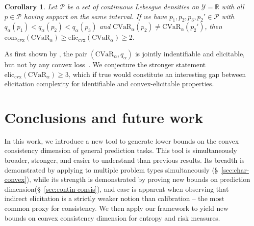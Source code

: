 \documentclass[11pt]{article} %
\newcommand{\Comments}{1}
\newcommand{\mynote}[2]{\ifnum\Comments=1\textcolor{#1}{#2}\fi}
\newcommand{\jessie}[1]{\mynote{purple}{[JF: #1]}}
\newcommand{\reals}{\mathbb{R}}
\newcommand{\eliccvx}{\mathrm{elic}_\mathrm{cvx}}
\newcommand{\conscvx}{\mathrm{cons}_\mathrm{cvx}}
\renewcommand{\P}{\mathcal{P}}
\newcommand{\Y}{\mathcal{Y}}
\newcommand{\CVaR}{\mathrm{CVaR}}
\newtheorem{corollary}{Corollary}
\begin{document}
\begin{corollary}
  \label{cor:spectral-risks}
  Let $\P$ be a set of continuous Lebesgue densities on $\Y=\reals$ with all $p \in \P$ having support on the same interval.
  If we have $p_1,p_2,p_3,p_2'\in\P$ with $q_\alpha(p_1) < q_\alpha(p_2) < q_\alpha(p_3)$ and $\CVaR_\alpha(p_2) \neq \CVaR_\alpha(p_2')$,
  then $\conscvx(\CVaR_\alpha) \geq \eliccvx(\CVaR_\alpha) \geq 2$.
\end{corollary}
As first shown by \citet{fissler2016higher}, the pair $(\CVaR_\alpha,q_\alpha)$ is jointly indentifiable and elicitable, but not by any convex loss~\citep[Prop.\ 4.2.31]{fissler2017higher}.
We conjecture the stronger statement $\eliccvx(\CVaR_\alpha) \geq 3$, which if true would constitute an interesting gap between elicitation complexity for identifiable and convex-elicitable properties.

\section{Conclusions and future work}\label{sec:conclusions}
In this work, we introduce a new tool to generate lower bounds on the convex consistency dimension of general prediction tasks.
This tool is simultaneously broader, stronger, and easier to understand than previous results.
Its breadth is demonstrated by applying to multiple problem types simultaneously (\S~\ref{sec:char-convex}), while its strength is demonstrated by proving new bounds on prediction dimension(\S~\ref{sec:contin-consis}), and ease is apparent when observing that indirect elicitation is a strictly weaker notion than calibration -- the most common proxy for consistency.
We then apply our framework to yield new bounds on convex consistency dimension for entropy and risk measures.
\end{document}
